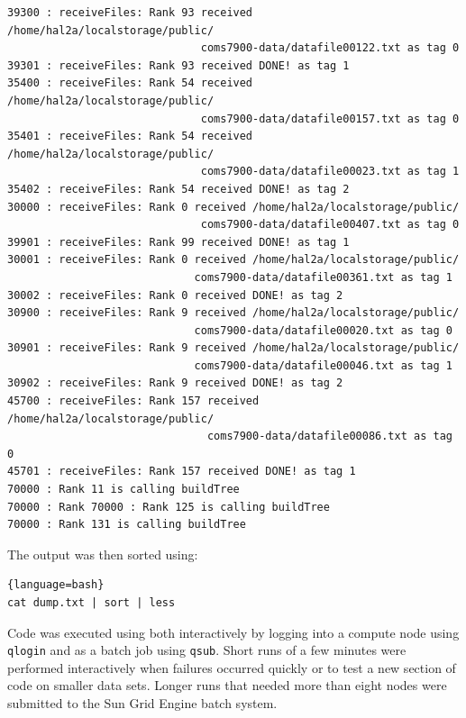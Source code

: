 \documentclass{article}
\begin{document}
\begin{mdframed}[backgroundcolor=blue!20]
	\setlength\itemsep{0.1pt}
	\setlength\parskip{0.1pt}
	\begin{verbatim}
39300 : receiveFiles: Rank 93 received /home/hal2a/localstorage/public/
                              coms7900-data/datafile00122.txt as tag 0
39301 : receiveFiles: Rank 93 received DONE! as tag 1
35400 : receiveFiles: Rank 54 received /home/hal2a/localstorage/public/
                              coms7900-data/datafile00157.txt as tag 0
35401 : receiveFiles: Rank 54 received /home/hal2a/localstorage/public/
                              coms7900-data/datafile00023.txt as tag 1
35402 : receiveFiles: Rank 54 received DONE! as tag 2
30000 : receiveFiles: Rank 0 received /home/hal2a/localstorage/public/
                              coms7900-data/datafile00407.txt as tag 0
39901 : receiveFiles: Rank 99 received DONE! as tag 1
30001 : receiveFiles: Rank 0 received /home/hal2a/localstorage/public/
                             coms7900-data/datafile00361.txt as tag 1
30002 : receiveFiles: Rank 0 received DONE! as tag 2
30900 : receiveFiles: Rank 9 received /home/hal2a/localstorage/public/
                             coms7900-data/datafile00020.txt as tag 0
30901 : receiveFiles: Rank 9 received /home/hal2a/localstorage/public/
                             coms7900-data/datafile00046.txt as tag 1
30902 : receiveFiles: Rank 9 received DONE! as tag 2
45700 : receiveFiles: Rank 157 received /home/hal2a/localstorage/public/
                               coms7900-data/datafile00086.txt as tag 0
45701 : receiveFiles: Rank 157 received DONE! as tag 1
70000 : Rank 11 is calling buildTree
70000 : Rank 70000 : Rank 125 is calling buildTree
70000 : Rank 131 is calling buildTree	
    \end{verbatim}
\end{mdframed}

The output was then sorted using:

\begin{lstlisting}{language=bash}
cat dump.txt | sort | less
\end{lstlisting}


Code was executed using both interactively by logging into a compute node using \texttt{qlogin} and as a batch job using \texttt{qsub}. Short runs of a few minutes were performed interactively when failures occurred quickly or to test a new section of code on smaller data sets. Longer runs that needed more than eight nodes were submitted to the Sun Grid Engine batch system.  
\end{document}
